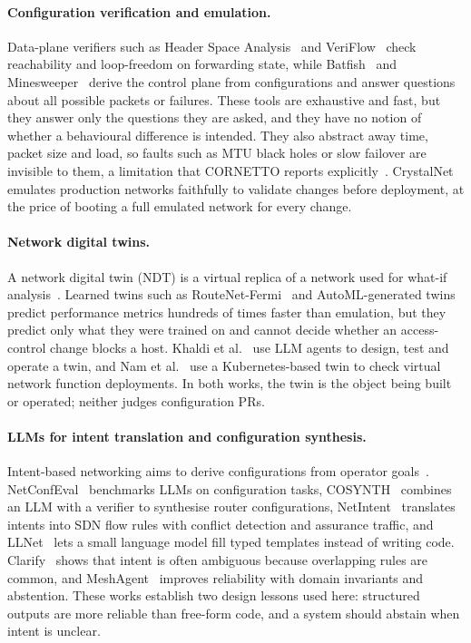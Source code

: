 \documentclass[pdflatex,iicol,sn-mathphys-num]{sn-jnl}%
\theoremstyle{thmstyletwo}%
\begin{document}
\paragraph{Configuration verification and emulation.} Data-plane verifiers such as Header Space Analysis~\cite{kazemian2012hsa} and VeriFlow~\cite{khurshid2013veriflow} check reachability and loop-freedom on forwarding state, while Batfish~\cite{fogel2015batfish} and Minesweeper~\cite{beckett2017minesweeper} derive the control plane from configurations and answer questions about all possible packets or failures. These tools are exhaustive and fast, but they answer only the questions they are asked, and they have no notion of whether a behavioural difference is intended. They also abstract away time, packet size and load, so faults such as MTU black holes or slow failover are invisible to them, a limitation that CORNETTO reports explicitly~\cite{asadli2026cornetto}. CrystalNet~\cite{liu2017crystalnet} emulates production networks faithfully to validate changes before deployment, at the price of booting a full emulated network for every change.

\paragraph{Network digital twins.} A network digital twin (NDT) is a virtual replica of a network used for what-if analysis~\cite{almasan2022ndt}. Learned twins such as RouteNet-Fermi~\cite{ferriol2023routenet} and AutoML-generated twins~\cite{ding2025autotwin} predict performance metrics hundreds of times faster than emulation, but they predict only what they were trained on and cannot decide whether an access-control change blocks a host. Khaldi et al.~\cite{khaldi2026agentic} use LLM agents to design, test and operate a twin, and Nam et al.~\cite{nam2026vnf} use a Kubernetes-based twin to check virtual network function deployments. In both works, the twin is the object being built or operated; neither judges configuration PRs.

\paragraph{LLMs for intent translation and configuration synthesis.} Intent-based networking aims to derive configurations from operator goals~\cite{rfc9315}. NetConfEval~\cite{wang2024netconfeval} benchmarks LLMs on configuration tasks, COSYNTH~\cite{mondal2023cosynth} combines an LLM with a verifier to synthesise router configurations, NetIntent~\cite{hossain2025netintent} translates intents into SDN flow rules with conflict detection and assurance traffic, and LLNet~\cite{angi2025llnet} lets a small language model fill typed templates instead of writing code. Clarify~\cite{mondal2025clarify} shows that intent is often ambiguous because overlapping rules are common, and MeshAgent~\cite{zhou2025meshagent} improves reliability with domain invariants and abstention. These works establish two design lessons used here: structured outputs are more reliable than free-form code, and a system should abstain when intent is unclear.
\end{document}

